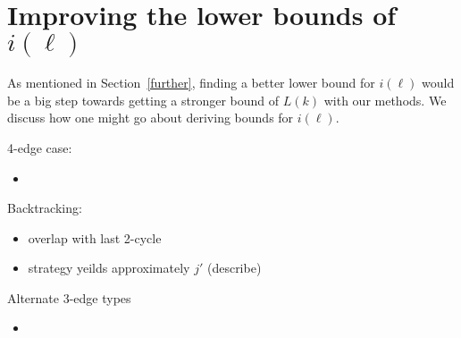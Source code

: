 \documentclass{article}
\begin{document}
\section{Improving the lower bounds of \texorpdfstring{$i(\ell)$}{i(l)}}

As mentioned in Section~\ref{further}, finding a better lower bound for $i(\ell)$ would be a big step towards getting a stronger bound of $L(k)$ with our methods. We discuss how one might go about deriving bounds for $i(\ell)$.

4-edge case:
\begin{itemize}
    \item 
\end{itemize}

Backtracking: 
\begin{itemize}
    \item overlap with last 2-cycle
    \item strategy yeilds approximately $j'$ (describe)
\end{itemize}

Alternate 3-edge types
\begin{itemize}
    \item 
\end{itemize}
\end{document}
